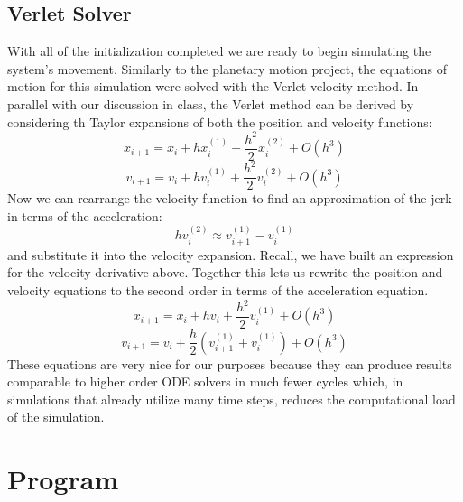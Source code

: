 \documentclass[11pt,twocolumn]{article}
\begin{document}
\subsection{Verlet Solver}
With all of the initialization completed we are ready to begin simulating the system's movement. Similarly to the planetary motion project, the equations of motion for this simulation were solved with the Verlet velocity method. In parallel with our discussion in class\cite{morten github}, the Verlet method can be derived by considering th Taylor expansions of both the position and velocity functions: 
\begin{equation}
x_{i+1} = x_i+hx^{(1)}_i+\frac{h^2}{2}x^{(2)}_i+O(h^3)
\end{equation}
\begin{equation}
v_{i+1} = v_i+hv^{(1)}_i+\frac{h^2}{2}v^{(2)}_i+O(h^3)
\end{equation}
Now we can rearrange the velocity function to find an approximation of the jerk in terms of the acceleration:   
\begin{equation}
hv^{(2)}_i\approx v^{(1)}_{i+1}-v^{(1)}_i
\end{equation}
and substitute it into the velocity expansion. Recall, we have built an expression for the velocity derivative above. Together this lets us rewrite the position and velocity equations to the second order in terms of the acceleration equation. 
\begin{equation}
x_{i+1} = x_i+hv_i+\frac{h^2}{2}v^{(1)}_{i}+O(h^3)
\end{equation}
\begin{equation}
v_{i+1} = v_i+\frac{h}{2}\left( v^{(1)}_{i+1}+v^{(1)}_{i}\right)+O(h^3)
\end{equation}
These equations are very nice for our purposes because they can produce results comparable to higher order ODE solvers in much fewer cycles which, in simulations that already utilize many time steps, reduces the computational load of the simulation. 
\section{Program}
\end{document}
